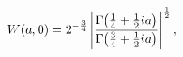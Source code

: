 \[\mathop{W\/}\nolimits\!\left(a,0\right)=2^{-\frac{3}{4}}\left|\frac{\mathop{%
\Gamma\/}\nolimits\!\left(\tfrac{1}{4}+\tfrac{1}{2}ia\right)}{\mathop{\Gamma\/%
}\nolimits\!\left(\tfrac{3}{4}+\tfrac{1}{2}ia\right)}\right|^{\frac{1}{2}},\]